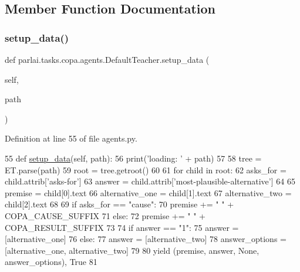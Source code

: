 \subsection{Member Function Documentation}
\mbox{\label{classparlai_1_1tasks_1_1copa_1_1agents_1_1DefaultTeacher_ac4f70712171ace8882590d73247dcb5e}} 
\subsubsection{\texorpdfstring{setup\+\_\+data()}{setup\_data()}}
{\footnotesize\ttfamily def parlai.\+tasks.\+copa.\+agents.\+Default\+Teacher.\+setup\+\_\+data (\begin{DoxyParamCaption}\item[{}]{self,  }\item[{}]{path }\end{DoxyParamCaption})}



Definition at line 55 of file agents.\+py.


\begin{DoxyCode}
55     \textcolor{keyword}{def }\hyperlink{namespaceparlai_1_1tasks_1_1multinli_1_1agents_a4fa2cb0ba1ed745336ad8bceed36b841}{setup\_data}(self, path):
56         print(\textcolor{stringliteral}{'loading: '} + path)
57 
58         tree = ET.parse(path)
59         root = tree.getroot()
60 
61         \textcolor{keywordflow}{for} child \textcolor{keywordflow}{in} root:
62             asks\_for = child.attrib[\textcolor{stringliteral}{'asks-for'}]
63             answer = child.attrib[\textcolor{stringliteral}{'most-plausible-alternative'}]
64 
65             premise = child[0].text
66             alternative\_one = child[1].text
67             alternative\_two = child[2].text
68 
69             \textcolor{keywordflow}{if} asks\_for == \textcolor{stringliteral}{"cause"}:
70                 premise += \textcolor{stringliteral}{" "} + COPA\_CAUSE\_SUFFIX
71             \textcolor{keywordflow}{else}:
72                 premise += \textcolor{stringliteral}{" "} + COPA\_RESULT\_SUFFIX
73 
74             \textcolor{keywordflow}{if} answer == \textcolor{stringliteral}{"1"}:
75                 answer = [alternative\_one]
76             \textcolor{keywordflow}{else}:
77                 answer = [alternative\_two]
78             answer\_options = [alternative\_one, alternative\_two]
79 
80             \textcolor{keywordflow}{yield} (premise, answer, \textcolor{keywordtype}{None}, answer\_options), \textcolor{keyword}{True}
81 \end{DoxyCode}


